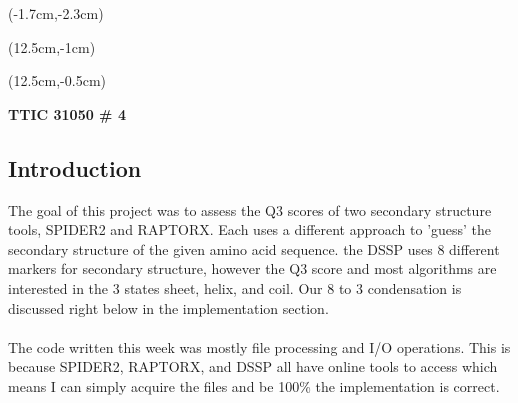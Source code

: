 \documentclass[12pt, oneside]{article}
\begin{document}

\begin{textblock*}{4cm}(-1.7cm,-2.3cm)
\end{textblock*}

\begin{textblock*}{8cm}(12.5cm,-1cm)
\end{textblock*}
\begin{textblock*}{3cm}(12.5cm,-0.5cm)
\end{textblock*}

\vspace{1cm}

\begin{center}
\textbf{\Large TTIC 31050 \# 4}
\end{center}

\subsection*{Introduction}
The goal of this project was to assess the Q3 scores of two secondary structure tools, SPIDER2 and RAPTORX. Each uses a different approach to 'guess' the secondary structure of the given amino acid sequence. the DSSP uses 8 different markers for secondary structure, however the Q3 score and most algorithms are interested in the 3 states sheet, helix, and coil. Our 8 to 3 condensation is discussed right below in the implementation section. \\ \\
The code written this week was mostly file processing and I/O operations. This is because SPIDER2, RAPTORX, and DSSP all have online tools to access which means I can simply acquire the files and be 100\% the implementation is correct.
\end{document}
